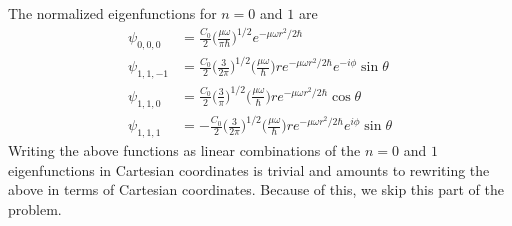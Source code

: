 \documentclass[../principles-of-quantum-mechanics.tex]{subfiles}
\begin{document}
\begin{questions}
\begin{solution}
			The normalized eigenfunctions for $n = 0$ and $1$ are
			\begin{align*}
				\psi_{0, 0, 0} &= \frac{C_0}{2}\Big(\frac{\mu\omega}{\pi\hbar}\Big)^{1/2}e^{-\mu\omega r^2/2\hbar} \\
				\psi_{1, 1, -1} &= \frac{C_0}{2}\Big(\frac{3}{2\pi}\Big)^{1/2}\Big(\frac{\mu\omega}{\hbar}\Big)r e^{-\mu\omega r^2/2\hbar}e^{-i\phi}\sin\theta \\
				\psi_{1, 1, 0} &= \frac{C_0}{2}\Big(\frac{3}{\pi}\Big)^{1/2}\Big(\frac{\mu\omega}{\hbar}\Big)r e^{-\mu\omega r^2/2\hbar}\cos\theta \\
				\psi_{1, 1, 1} &= {-\frac{C_0}{2}}\Big(\frac{3}{2\pi}\Big)^{1/2}\Big(\frac{\mu\omega}{\hbar}\Big)r e^{-\mu\omega r^2/2\hbar}e^{i\phi}\sin\theta
			\end{align*}
			Writing the above functions as linear combinations of the $n = 0$ and $1$ eigenfunctions in Cartesian coordinates is trivial and amounts to rewriting the above in terms of Cartesian coordinates. Because of this, we skip this part of the problem.
		\end{solution}
	\end{questions}
\end{document}
